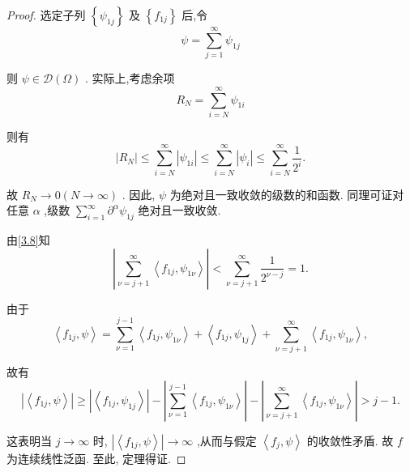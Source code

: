 \documentclass[lang=cn,newtx,10pt,scheme=chinese,thmcnt=chapter]{elegantbook}
\begin{document}
\begin{proof}
选定子列 \(\left\{  {\psi }_{1j}\right\}\) 及 \(\left\{  {f}_{1j}\right\}\) 后,令
\begin{equation*}
\psi  = \mathop{\sum }\limits_{{j = 1}}^{\infty }{\psi }_{1j}
\end{equation*}

则 \(\psi  \in  \mathcal{D}\left( \Omega \right)\) . 实际上,考虑余项
\begin{equation*}
{R}_{N} = \mathop{\sum }\limits_{{i = N}}^{\infty }{\psi }_{1i}
\end{equation*}

则有
\begin{equation*}
\left| {R}_{N}\right|  \leqslant  \mathop{\sum }\limits_{{i = N}}^{\infty }\left| {\psi }_{1i}\right|  \leqslant  \mathop{\sum }\limits_{{i = N}}^{\infty }\left| {\psi }_{i}\right|  \leqslant  \mathop{\sum }\limits_{{i = N}}^{\infty }\frac{1}{{2}^{i}}.
\end{equation*}

故 \({R}_{N} \rightarrow  0\left( {N \rightarrow  \infty }\right)\) . 因此, \(\psi\) 为绝对且一致收敛的级数的和函数. 同理可证对任意 \(\alpha\) ,级数 \(\mathop{\sum }\limits_{{i = 1}}^{\infty }{\partial }^{\alpha }{\psi }_{1j}\) 绝对且一致收敛.

由\ref{3.8}知
\begin{equation*}
\left| {\mathop{\sum }\limits_{{\nu  = j + 1}}^{\infty }\left\langle  {{f}_{1j},{\psi }_{1\nu }}\right\rangle  }\right|  < \mathop{\sum }\limits_{{\nu  = j + 1}}^{\infty }\frac{1}{{2}^{\nu  - j}} = 1.
\end{equation*}

由于
\begin{equation*}
\left\langle  {{f}_{1j},\psi }\right\rangle   = \mathop{\sum }\limits_{{\nu  = 1}}^{{j - 1}}\left\langle  {{f}_{1j},{\psi }_{1\nu }}\right\rangle   + \left\langle  {{f}_{1j},{\psi }_{1j}}\right\rangle   + \mathop{\sum }\limits_{{\nu  = j + 1}}^{\infty }\left\langle  {{f}_{1j},{\psi }_{1\nu }}\right\rangle  ,
\end{equation*}

故有
\begin{equation*}
\left| \left\langle  {{f}_{1j},\psi }\right\rangle  \right|  \geq  \left| \left\langle  {{f}_{1j},{\psi }_{1j}}\right\rangle  \right|  - \left| {\mathop{\sum }\limits_{{\nu  = 1}}^{{j - 1}}\left\langle  {{f}_{1j},{\psi }_{1\nu }}\right\rangle  }\right|  - \left| {\mathop{\sum }\limits_{{\nu  = j + 1}}^{\infty }\left\langle  {{f}_{1j},{\psi }_{1\nu }}\right\rangle  }\right|  > j - 1.
\end{equation*}

这表明当 \(j \rightarrow  \infty\) 时, \(\left| \left\langle  {{f}_{1j},\psi }\right\rangle  \right|  \rightarrow  \infty\) ,从而与假定 \(\left\langle  {{f}_{j},\psi }\right\rangle\) 的收敛性矛盾. 故 \(f\) 为连续线性泛函. 至此, 定理得证.
\end{proof}
\end{document}
